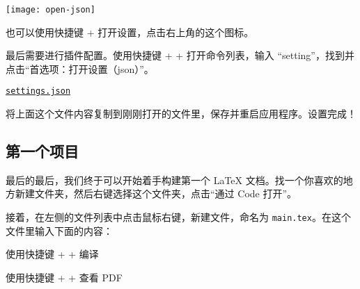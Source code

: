 \begin{marginfigure}
  \centering
  \texttt{[image: open-json]}
  \caption{也可以使用快捷键  + \kbd{,} 打开设置，点击右上角的这个图标。}
  \end{marginfigure}

最后需要进行插件配置。使用快捷键  +  +  打开命令列表，输入 “setting”，找到并点击“首选项：打开设置（json）”。

\medskip
\href{https://git.nju.edu.cn/atXYblip/install-latex-instantly/-/raw/main/.vscode/settings.json}{\faFile*[regular] \texttt{settings.json}}
\medskip

将上面这个文件内容复制到刚刚打开的文件里，保存并重启应用程序。设置完成！

\subsection{第一个项目}

\begin{widepar}
最后的最后，我们终于可以开始着手构建第一个 \LaTeX{} 文档。找一个你喜欢的地方新建文件夹，然后右键选择这个文件夹，点击“通过 Code 打开”。

接着，在左侧的文件列表中点击鼠标右键，新建文件，命名为 \texttt{main.tex}。在这个文件里输入下面的内容：
\end{widepar}


\begin{widepar}
使用快捷键  +  +  编译

使用快捷键  +  +  查看 PDF
\end{widepar}
